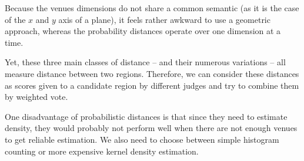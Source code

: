 \documentclass[a4paper,11pt,draft]{scrartcl}
\begin{document}
Because the venues dimensions do not share a common semantic (as it is the case
of the $x$ and $y$ axis of a plane), it feels rather awkward to use a geometric
approach, whereas the probability distances operate over one dimension at a
time.

Yet, these three main classes of distance -- and their numerous variations --
all measure distance between two regions. Therefore, we can consider these
distances as scores given to a candidate region by different judges and try to
combine them by weighted vote.

One disadvantage of probabilistic distances is that since they need to
estimate density, they would probably not perform well when there are not
enough venues to get reliable estimation.  We also need to choose between
simple histogram counting or more expensive kernel density estimation.

\end{document}
